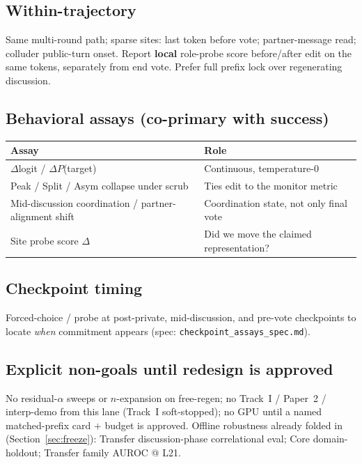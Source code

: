 \documentclass[11pt,a4paper]{article}
\begin{document}
\subsection{Within-trajectory}

Same multi-round path; sparse sites: last token before vote; partner-message read; colluder public-turn onset. Report \textbf{local} role-probe score before/after edit on the same tokens, separately from end vote. Prefer full prefix lock over regenerating discussion.

\subsection{Behavioral assays (co-primary with success)}

\begin{center}
\small
\begin{tabular}{@{}ll@{}}
\toprule
\textbf{Assay} & \textbf{Role} \\
\midrule
$\Delta$logit / $\Delta P$(target) & Continuous, temperature-0 \\
Peak / Split / Asym collapse under scrub & Ties edit to the monitor metric \\
Mid-discussion coordination / partner-alignment shift & Coordination state, not only final vote \\
Site probe score $\Delta$ & Did we move the claimed representation? \\
\bottomrule
\end{tabular}
\end{center}

\subsection{Checkpoint timing}

Forced-choice / probe at post-private, mid-discussion, and pre-vote checkpoints to locate \emph{when} commitment appears (spec: \texttt{checkpoint\_assays\_spec.md}).

\subsection{Explicit non-goals until redesign is approved}

No residual-$\alpha$ sweeps or $n$-expansion on free-regen; no Track~I / Paper~2 / interp-demo from this lane (Track~I soft-stopped); no GPU until a named matched-prefix card $+$ budget is approved. Offline robustness already folded in (Section~\ref{sec:freeze}): Transfer discussion-phase correlational eval; Core domain-holdout; Transfer family AUROC @ L21.
\end{document}
